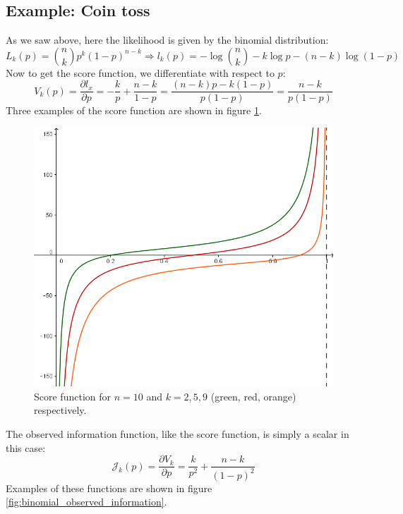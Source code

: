 \documentclass[12pt, a4paper]{article}
\numberwithin{equation}{section}
\begin{document}
\subsection{Example: Coin toss}
As we saw above, here the likelihood is given by the binomial distribution:
\begin{equation}
L_k(p)=\binom{n}{k}p^k(1-p)^{n-k}\Rightarrow l_k(p)=-\log\binom{n}{k}-k\log p-(n-k)\log(1-p)
\end{equation}
Now to get the score function, we differentiate with respect to $p$:
\begin{equation}
V_k(p)=\frac{\partial l_x}{\partial p}=-\frac{k}{p}+\frac{n-k}{1-p}=\frac{(n-k)p-k(1-p)}{p(1-p)}=\frac{n-k}{p(1-p)}
\end{equation}
Three examples of the score function are shown in figure \ref{fig:binomial_score}.

\begin{figure}
\centering
\includegraphics[width=.8\textwidth]{binomial_score}
\caption{Score function for $n=10$ and $k=2, 5, 9$ (green, red, orange) respectively.}
\label{fig:binomial_score}
\end{figure}

The observed information function, like the score function, is simply a scalar in this case:
\begin{equation}
\label{binomial_observed_information}
\mathcal{J}_k(p)=\frac{\partial V_k}{\partial p}=\frac{k}{p^2}+\frac{n-k}{(1-p)^2}
\end{equation}
Examples of these functions are shown in figure \ref{fig:binomial_observed_information}.
\end{document}
